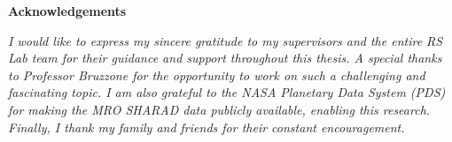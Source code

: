 \thispagestyle{empty}

\begin{center}
  {\bf \Huge Acknowledgements}
\end{center}

\vspace{4cm}


\emph{
  I would like to express my sincere gratitude to my supervisors and the entire RS Lab team for their guidance and support throughout this thesis.
A special thanks to Professor Bruzzone for the opportunity to work on such a challenging and fascinating topic.
I am also grateful to the NASA Planetary Data System (PDS) for making the MRO SHARAD data publicly available, enabling this research.
Finally, I thank my family and friends for their constant encouragement.
}

